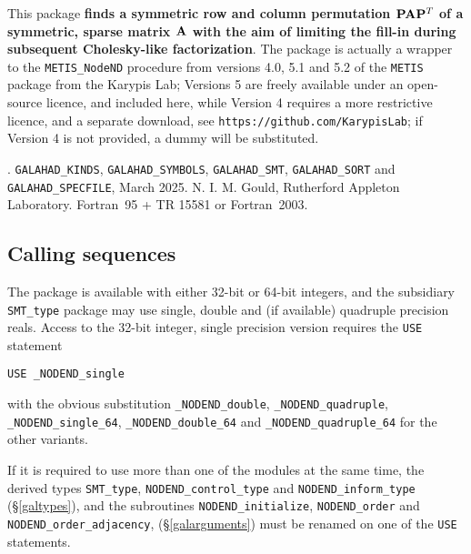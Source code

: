 \documentclass{galahad}
\newcommand{\packagename}{NODEND}
\newcommand{\fullpackagename}{\libraryname\_\-\packagename}
\begin{document}
\galheader


\galsummary

This package
{\bf finds a symmetric row and column permutation ${\mathbf{P}} {\mathbf{A}} {\mathbf{P}}^T$ 
of a symmetric, sparse matrix ${\mathbf{A}}$ with the aim of limiting 
the fill-in during subsequent Cholesky-like factorization}. 
The package is actually a wrapper to the {\tt METIS\_NodeND} 
procedure from versions 4.0, 5.1 and 5.2 of the
{\tt METIS} package from the Karypis Lab; Versions 5 are freely 
available under an open-source licence, and included here, 
while Version 4 requires a more restrictive licence, and a separate download, 
see {\tt https://github.com/KarypisLab}; if Version 4 is not provided,
a dummy will be substituted.


\galattributes
\galversions{\tt  \fullpackagename\_single, \fullpackagename\_double}.
\galcalls
{\tt GALAHAD\-\_KINDS},
{\tt GAL\-AHAD\-\_SYMBOLS},
{\tt GALAHAD\_SMT},
{\tt GALAHAD\_\-SORT}
and 
{\tt GALAHAD\_SPECFILE},
\galdate March 2025.
\galorigin N. I. M. Gould, Rutherford Appleton Laboratory.
\gallanguage Fortran~95 + TR 15581 or Fortran~2003.


\galhowto

\subsection{Calling sequences}

The package is available with either 32-bit or 64-bit integers, 
and the subsidiary {\tt SMT\_type} package may use
single, double and (if available) quadruple precision reals.
Access to the 32-bit integer,
single precision version requires the {\tt USE} statement
\medskip

\hspace{8mm} {\tt USE \fullpackagename\_single}

\medskip
\noindent
with the obvious substitution 
{\tt \fullpackagename\_double},
{\tt \fullpackagename\_quadruple},
{\tt \fullpackagename\_single\_64},
{\tt \fullpackagename\_double\_64} and
{\tt \fullpackagename\_quadruple\_64} for the other variants.

\noindent
If it is required to use more than one of the modules at the same time, 
the derived types
{\tt SMT\_type},
{\tt \packagename\_control\_type}
and
{\tt \packagename\_inform\_type}
(\S\ref{galtypes}),
and the subroutines
{\tt \packagename\-\_initialize},
{\tt \packagename\-\_order}
and
{\tt \packagename\-\_order\_adjacency},
(\S\ref{galarguments})
must be renamed on one of the {\tt USE} statements.
\end{document}
